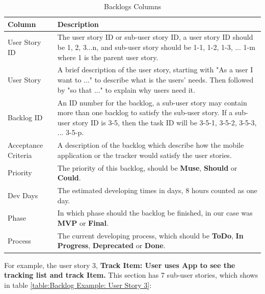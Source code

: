 \documentclass[12pt,a4paper]{article}
\begin{document}
          \begin{table}[H]
            \centering
              \begin{tabularx}{\textwidth}{l X}
                \hline
                Column & Description  \\ \hline
                User Story ID & The user story ID or sub-user story ID, a user story ID should be 1, 2, 3...n, and sub-user story should be 1-1, 1-2, 1-3, ... 1-m  where 1 is the parent user story.\\ 
                User Story & A brief description of the user story, starting with "As a user I want to ..." to describe what is the users' needs. Then followed by "so that ..." to explain why users need it. \\ 
                Backlog ID & An ID number for the backlog, a sub-user story may contain more than one backlog to satisfy the sub-user story. If a sub-user story ID is  3-5, then the task ID will be 3-5-1, 3-5-2, 3-5-3, ... 3-5-p.  \\ 
                Acceptance Criteria & A description of the backlog which describe how the mobile application or the tracker would satisfy the user stories. \\ 
                Priority & The priority of this backlog, should be {\bf Muse}, {\bf Should} or {\bf Could}. \\                  
                Dev Days & The estimated developing times in days, 8 hours counted as one day. \\                  
                Phase & In which phase should the backlog be finished, in our case was {\bf MVP} or {\bf Final}. \\                  
                Process & The current developing process, which should be {\bf ToDo}, {\bf In Progress}, {\bf Deprecated} or {\bf Done}.  \\                  
                \hline
              \end{tabularx}
              \caption[Table caption text]{Backlogs Columns}
              \label{table:Backlogs Column}
          \end{table}
          
          For example, the user story 3, {\bf Track Item: User uses App to see the tracking list and track Item.} This section has 7 sub-user stories, which shows in table \ref{table:Backlog Example: User Story 3}: 
          
\end{document}
